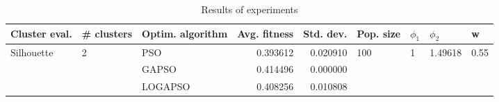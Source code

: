 \begin{table}
\centering
\caption{Results of experiments}
\begin{tabular}{lllrrllll}
\toprule
              Cluster eval. &        \# clusters & Optim. algorithm &  Avg. fitness &  Std. dev. &            Pop. size &         $\phi_{1}$ &               $\phi_{2}$ &                     w \\
\midrule
\multirow{3}{*}{Silhouette} & \multirow{3}{*}{2} &              PSO &      0.393612 &   0.020910 & \multirow{3}{*}{100} & \multirow{3}{*}{1} & \multirow{3}{*}{1.49618} & \multirow{3}{*}{0.55} \\
                            &                    &            GAPSO &      0.414496 &   0.000000 &                      &                    &                          &                       \\
                            &                    &          LOGAPSO &      0.408256 &   0.010808 &                      &                    &                          &                       \\
\bottomrule
\end{tabular}
\end{table}
